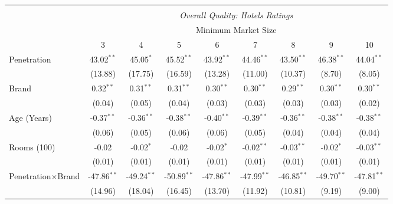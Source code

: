\begin{table}[!htbp]
{\begin{tabular}{@{\extracolsep{5pt}}lcccccccc}
\hline 
\\[-1.8ex]
& \multicolumn{8}{c}{\textit{Overall Quality: Hotels Ratings}} \\ 
\cline{2-9} 
& \multicolumn{8}{c}{Minimum Market Size} \\
& 3 & 4 & 5 & 6 & 7 & 8 & 9 & 10\\ 
\hline 
 Penetration & 43.02$^{**}$ & 45.05$^{*}$ & 45.52$^{**}$ & 43.92$^{**}$ & 44.46$^{**}$ & 43.50$^{**}$ & 46.38$^{**}$ & 44.04$^{**}$ \\ 
  & (13.88) & (17.75) & (16.59) & (13.28) & (11.00) & (10.37) & (8.70) & (8.05) \\
 Brand & 0.32$^{**}$ & 0.31$^{**}$ & 0.31$^{**}$ & 0.30$^{**}$ & 0.30$^{**}$ & 0.29$^{**}$ & 0.30$^{**}$ & 0.30$^{**}$ \\ 
  & (0.04) & (0.05) & (0.04) & (0.03) & (0.03) & (0.03) & (0.03) & (0.02) \\ 
 Age (Years) & -0.37$^{**}$ & -0.36$^{**}$ & -0.38$^{**}$ & -0.40$^{**}$ & -0.39$^{**}$ & -0.36$^{**}$ & -0.38$^{**}$ & -0.38$^{**}$ \\ 
  & (0.06) & (0.05) & (0.06) & (0.06) & (0.05) & (0.04) & (0.04) & (0.04) \\ 
 Rooms (100) & -0.02 & -0.02$^{*}$ & -0.02 & -0.02$^{*}$ & -0.02$^{**}$ & -0.03$^{**}$ & -0.02$^{*}$ & -0.03$^{**}$ \\ 
  & (0.01) & (0.01) & (0.01) & (0.01) & (0.01) & (0.01) & (0.01) & (0.01) \\ 
 Penetration$\times$Brand & -47.86$^{**}$ & -49.24$^{**}$ & -50.89$^{**}$ & -47.86$^{**}$ & -47.99$^{**}$ & -46.85$^{**}$ & -49.70$^{**}$ & -47.81$^{**}$ \\ 
  & (14.96) & (18.04) & (16.45) & (13.70) & (11.92) & (10.81) & (9.19) & (9.00) \\ 
 

\end{tabular}}
\end{table}
